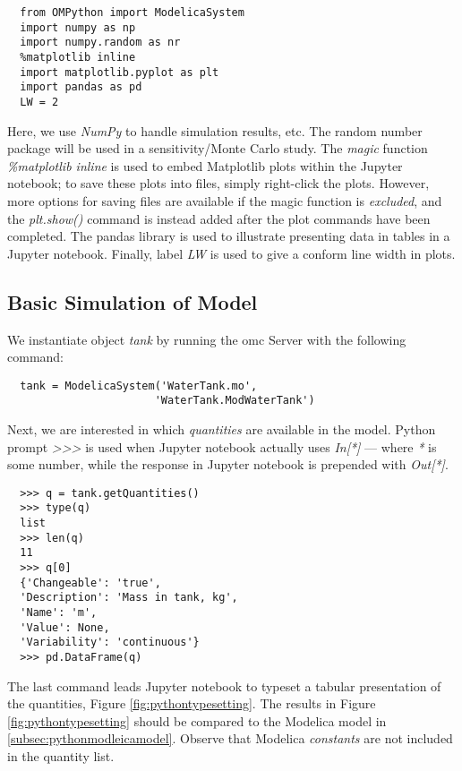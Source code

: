 \begin{lstlisting}
  from OMPython import ModelicaSystem
  import numpy as np
  import numpy.random as nr
  %matplotlib inline
  import matplotlib.pyplot as plt
  import pandas as pd
  LW = 2
\end{lstlisting}

Here, we use \textit{NumPy} to handle simulation results, etc. The random number package will be used in
a sensitivity/Monte Carlo study. The \textit{magic} function \textit{\%matplotlib inline} is used to embed Matplotlib
plots within the Jupyter notebook; to save these plots into files, simply right-click the plots. However, more options
for saving files are available if the magic function is \textit{excluded}, and the \textit{plt.show()} command is instead added
after the plot commands have been completed. The pandas library is used to illustrate presenting data in tables in a Jupyter
notebook. Finally, label \textit{LW} is used to give a conform line width in plots.

\subsection{Basic Simulation of Model}
\label{subsec:pythonsimulatemodel}

We instantiate object \textit{tank} by running the \acrshort{omc} Server with the following command:

\begin{lstlisting}
  tank = ModelicaSystem('WaterTank.mo',
                       'WaterTank.ModWaterTank')
\end{lstlisting}

Next, we are interested in which \textit{quantities} are available in the model. Python prompt \textit{>>>} is used when Jupyter
notebook actually uses \textit{In[*]} — where \textit{*} is some number, while the response in Jupyter notebook is prepended
with \textit{Out[*]}.

\begin{lstlisting}
  >>> q = tank.getQuantities()
  >>> type(q)
  list
  >>> len(q)
  11
  >>> q[0]
  {'Changeable': 'true', 
  'Description': 'Mass in tank, kg',
  'Name': 'm',
  'Value': None,
  'Variability': 'continuous'}
  >>> pd.DataFrame(q)
\end{lstlisting}

The last command leads Jupyter notebook to typeset a tabular presentation of the quantities, Figure \ref{fig:pythontypesetting}. The results
in Figure \ref{fig:pythontypesetting} should be compared to the Modelica model in \ref{subsec:pythonmodleicamodel}. Observe that Modelica \textit{constants} are not included in the quantity list.

